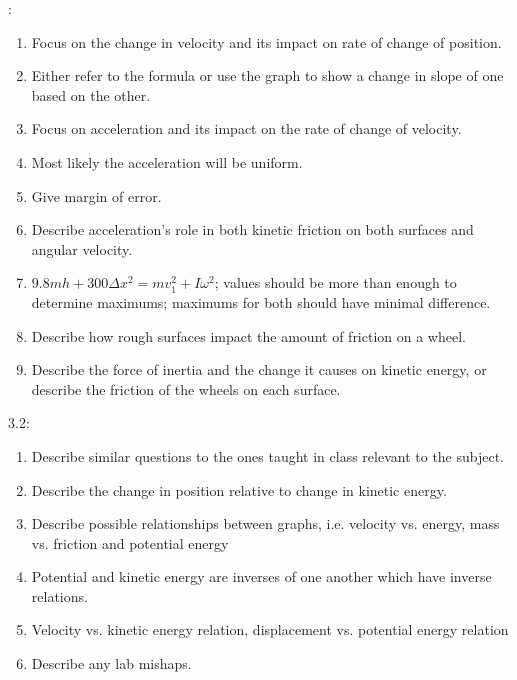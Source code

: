 \documentclass[12pt, letterpaper]{report}
\begin{document}
    :
    \begin{enumerate}
      \item{Focus on the change in velocity and its impact on rate of change of position.}
      \item{Either refer to the formula or use the graph to show a change in slope of one based on the other.}
      \item{Focus on acceleration and its impact on the rate of change of velocity.}
      \item{Most likely the acceleration will be uniform.}
      \item{Give margin of error.}
      \item{Describe acceleration's role in both kinetic friction on both surfaces and angular velocity.}
      \item{$9.8mh + 300\Delta x^{2}=mv_{1}^{2}+I\omega^{2}$; values should be more than enough to determine maximums; maximums for both should have minimal difference.}
      \item{Describe how rough surfaces impact the amount of friction on a wheel.}
      \item{Describe the force of inertia and the change it causes on kinetic energy, or describe the friction of the wheels on each surface.}
    \end{enumerate}
    3.2:
    \begin{enumerate}
      \item{Describe similar questions to the ones taught in class relevant to the subject.}
      \item{Describe the change in position relative to change in kinetic energy.}
      \item{Describe possible relationships between graphs, i.e. velocity vs. energy, mass vs. friction and potential energy}
      \item{Potential and kinetic energy are inverses of one another which have inverse relations.}
      \item{Velocity vs. kinetic energy relation, displacement vs. potential energy relation}
      \item{Describe any lab mishaps.}
    \end{enumerate}
\end{document}
